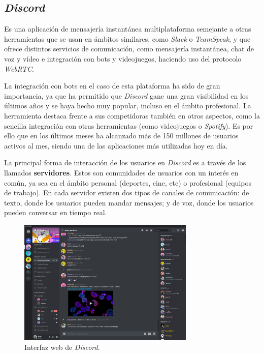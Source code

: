 \subsection{\textit{Discord}}

Es una aplicación de mensajería instantánea multiplataforma semejante a otras herramientas que se usan en ámbitos similares, como \textit{Slack} o \textit{TeamSpeak}, y que ofrece distintos servicios de comunicación, como mensajería instantánea, chat de voz y vídeo e integración con bots y videojuegos, haciendo uso del protocolo \textit{WebRTC}.

La integración con bots en el caso de esta plataforma ha sido de gran importancia, ya que ha permitido que \textit{Discord} gane una gran visibilidad en los últimos años y se haya hecho muy popular, incluso en el ámbito profesional. La herramienta destaca frente a sus competidoras también en otros aspectos\cite{earthweb}, como la sencilla integración con otras herramientas (como videojuegos o \textit{Spotify}). Es por ello que en los últimos meses ha alcanzado más de 150 millones de usuarios activos al mes, siendo una de las aplicaciones más utilizadas hoy en día.

La principal forma de interacción de los usuarios en \textit{Discord} es a través de los llamados \textbf{servidores}. Estos son  comunidades de usuarios con un interés en común, ya sea en el ámbito personal (deportes, cine, etc) o profesional (equipos de trabajo). En cada servidor existen dos tipos de canales de comunicación: de texto, donde los usuarios pueden mandar mensajes; y de voz, donde los usuarios pueden conversar en tiempo real.

\begin{figure}[H]
	\centering
	\includegraphics[width=0.75\textwidth]{img/discord.png}
	\caption{Interfaz web de \textit{Discord}.}
\end{figure}



